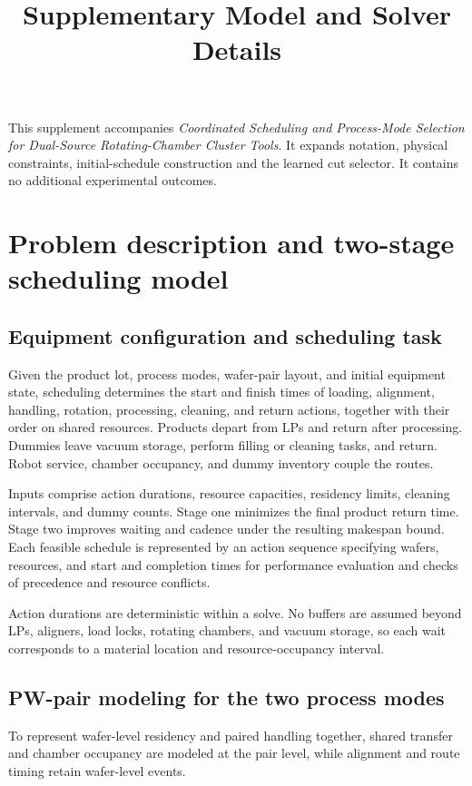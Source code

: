 \documentclass[journal]{IEEEtran}
\begin{document}
\raggedbottom
{}
\title{Supplementary Model and Solver Details}
\author{}\maketitle
This supplement accompanies \textit{Coordinated Scheduling and Process-Mode Selection for Dual-Source Rotating-Chamber Cluster Tools}. It expands notation, physical constraints, initial-schedule construction and the learned cut selector. It contains no additional experimental outcomes.
\section{Problem description and two-stage scheduling model}


\subsection{Equipment configuration and scheduling task}

Given the product lot, process modes, wafer-pair layout, and initial equipment state, scheduling determines the start and finish times of loading, alignment, handling, rotation, processing, cleaning, and return actions, together with their order on shared resources. Products depart from LPs and return after processing. Dummies leave vacuum storage, perform filling or cleaning tasks, and return. Robot service, chamber occupancy, and dummy inventory couple the routes.

Inputs comprise action durations, resource capacities, residency limits, cleaning intervals, and dummy counts. Stage one minimizes the final product return time. Stage two improves waiting and cadence under the resulting makespan bound. Each feasible schedule is represented by an action sequence specifying wafers, resources, and start and completion times for performance evaluation and checks of precedence and resource conflicts.

Action durations are deterministic within a solve. No buffers are assumed beyond LPs, aligners, load locks, rotating chambers, and vacuum storage, so each wait corresponds to a material location and resource-occupancy interval.

\subsection{PW-pair modeling for the two process modes}

To represent wafer-level residency and paired handling together, shared transfer and chamber occupancy are modeled at the pair level, while alignment and route timing retain wafer-level events.
\end{document}

